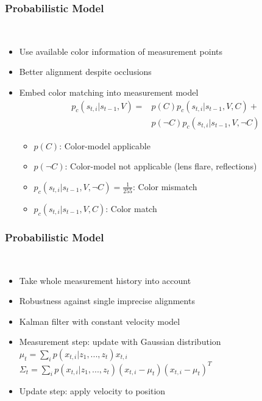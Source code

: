 \begin{frame}
  \frametitle{Probabilistic Model}
  \begin{description}[]
  \item[Adding Color] \hfill \\
  \begin{itemize}
  \item Use available color information of measurement points
  \item Better alignment despite occlusions
  \item Embed color matching into measurement model
  \begin{align}
p_c(s_{t,i}|s_{t-1},V)
  = &p(C)p_c(s_{t,i}|s_{t-1},V,C)+ \nonumber\\
&p(\neg C)p_c(s_{t,i}|s_{t-1},V,\neg C)\nonumber
  \end{align}
  \begin{itemize}
  \item $p(C)$: Color-model applicable
  \item $p(\neg C)$: Color-model not applicable (lens flare, reflections)
  \item $p_c(s_{t,i}|s_{t-1},V,\neg C)=\frac{1}{255}$: Color mismatch
  \item $p_c(s_{t,i}|s_{t-1},V,C)$: Color match
  \end{itemize}
  \end{itemize}
  \end{description}
\end{frame}

\begin{frame}
  \frametitle{Probabilistic Model}
  \begin{description}[]
  \item[Motion Model] \hfill \\
  \begin{itemize}
  \item Take whole measurement history into account
  \item Robustness against single imprecise alignments
  \pause
  \item Kalman filter with constant velocity model
  \item Measurement step: update with Gaussian distribution\\
        $\mu_t=\sum_i p(x_{t,i}|z_1,...,z_t)x_{t,i}$\\
        $\Sigma_t=\sum_i p(x_{t,i}|z_1,...,z_t) (x_{t,i}-\mu_t)(x_{t,i}-\mu_t)^T$
  \item Update step: apply velocity to position
  \end{itemize}
  \end{description}
\end{frame}


